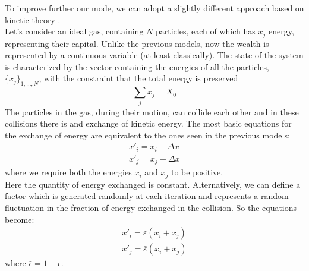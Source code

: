 To improve further our mode, we can adopt a slightly different approach based on kinetic theory \cite{econophysics}. \\
Let's consider an ideal gas, containing $N$ particles, each of which has $x_j$ energy, representing their capital.
Unlike the previous models, now the wealth is represented by a continuous variable (at least classically).
The state of the system is characterized by the vector containing the energies of all the particles, $\{x_j\}_{1,\ldots,N}$, with the constraint that the total energy is preserved
\begin{equation}
	\sum_j x_j = X_0
\end{equation}
The particles in the gas, during their motion, can collide each other and in these collisions there is and exchange of kinetic energy.
The most basic equations for the exchange of energy are equivalent to the ones seen in the previous models:
\begin{equation}
	\begin{split}
		x'_i = x_i - \Delta x \\
		x'_j = x_j + \Delta x 
	\end{split}
\end{equation}
where we require both the energies $x_i$ and $x_j$ to be positive. \\
Here the quantity of energy exchanged is constant.
Alternatively, we can define a factor which is generated randomly at each iteration and represents a random fluctuation in the fraction of energy exchanged in the collision.
So the equations become:
\begin{equation}
	\begin{split}
		x'_i = \varepsilon(x_i + x_j)	 \\
		x'_j = \bar{\varepsilon}(x_i + x_j)
	\end{split}
\end{equation}
where $\bar{\epsilon} = 1 - \epsilon$.\\

